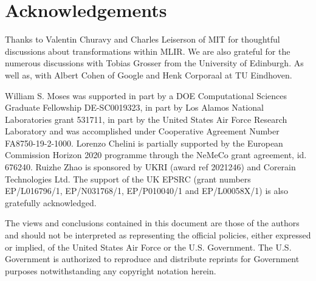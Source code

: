\documentclass[sigplan]{acmart}
\renewcommand{\todo}[2]{}
\begin{document}

\section*{Acknowledgements}


Thanks to Valentin Churavy and Charles Leiserson of MIT for thoughtful discussions about transformations within MLIR. We
are also grateful for the numerous discussions with Tobias Grosser
from the University of Edinburgh. As well as, with Albert Cohen of Google and Henk Corporaal at TU Eindhoven.

William S. Moses was supported in part by a DOE Computational Sciences Graduate Fellowship DE-SC0019323, in part by Los Alamos National Laboratories grant 531711, in part by the United States Air Force Research Laboratory and was accomplished under Cooperative Agreement Number FA8750-19-2-1000. Lorenzo Chelini is partially supported by the European Commission Horizon 2020 programme through the NeMeCo grant agreement, id. 676240. Ruizhe Zhao is sponsored by UKRI (award ref 2021246) and Corerain Technologies Ltd. The support of the UK EPSRC (grant numbers EP/L016796/1, EP/N031768/1, EP/P010040/1 and EP/L00058X/1) is also gratefully acknowledged. %

The views and conclusions contained in this document are those of the authors and should not be interpreted as representing the official policies, either expressed or implied, of the United States Air Force or the U.S. Government. The U.S. Government is authorized to reproduce and distribute reprints for Government purposes notwithstanding any copyright notation herein.



\balance
\end{document}
